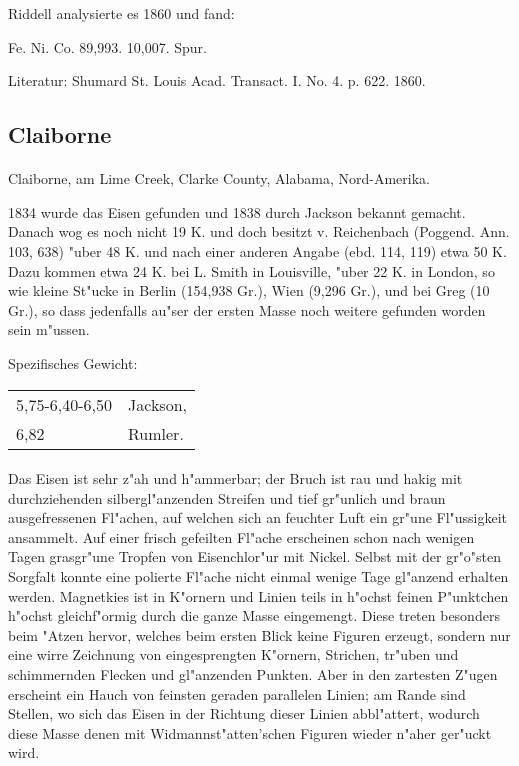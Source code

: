 \documentclass[a4paper, 11pt, oneside]{article}
\begin{document}
Riddell analysierte es 1860 und fand:

Fe. Ni. Co.  
89,993. 10,007. Spur.

Literatur: Shumard St. Louis Acad. Transact. I. No. 4. p. 622. 1860.

\subsection{Claiborne}
\normalsize
\paragraph{}
Claiborne, am Lime Creek, Clarke County, Alabama, Nord-Amerika.

1834 wurde das Eisen gefunden und 1838 durch Jackson bekannt gemacht. Danach wog es noch nicht 19 K. und doch besitzt v. Reichenbach (Poggend. Ann. 103, 638) "uber 48 K. und nach einer anderen Angabe (ebd. 114, 119) etwa 50 K. Dazu kommen etwa 24 K. bei L. Smith in Louisville, "uber 22 K. in London, so wie kleine St"ucke in Berlin (154,938 Gr.), Wien (9,296 Gr.), und bei Greg (10 Gr.), so dass jedenfalls au"ser der ersten Masse noch weitere gefunden worden sein m"ussen.

Spezifisches Gewicht:
\begin{table}[!ht]
    \centering
    \begin{tabular}{l l}
        5,75-6,40-6,50 & Jackson,\\
        6,82 & Rumler.
    \end{tabular}
\end{table}
\paragraph{}
Das Eisen ist sehr z"ah und h"ammerbar; der Bruch ist rau und hakig mit durchziehenden silbergl"anzenden Streifen und tief gr"unlich und braun ausgefressenen Fl"achen, auf welchen sich an feuchter Luft ein gr"une Fl"ussigkeit ansammelt. Auf einer frisch gefeilten Fl"ache erscheinen schon nach wenigen Tagen grasgr"une Tropfen von Eisenchlor"ur mit Nickel. Selbst mit der gr"o"sten Sorgfalt konnte eine polierte Fl"ache nicht einmal wenige Tage gl"anzend erhalten werden. Magnetkies ist in K"ornern und Linien teils in h"ochst feinen P"unktchen h"ochst gleichf"ormig durch die ganze Masse eingemengt. Diese treten besonders beim "Atzen hervor, welches beim ersten Blick keine Figuren erzeugt, sondern nur eine wirre Zeichnung von eingesprengten K"ornern, Strichen, tr"uben und schimmernden Flecken und gl"anzenden Punkten. Aber in den zartesten Z"ugen erscheint ein Hauch von feinsten geraden parallelen Linien; am Rande sind Stellen, wo sich das Eisen in der Richtung dieser Linien abbl"attert, wodurch diese Masse denen mit Widmannst"atten'schen Figuren wieder n"aher ger"uckt wird.
\end{document}
